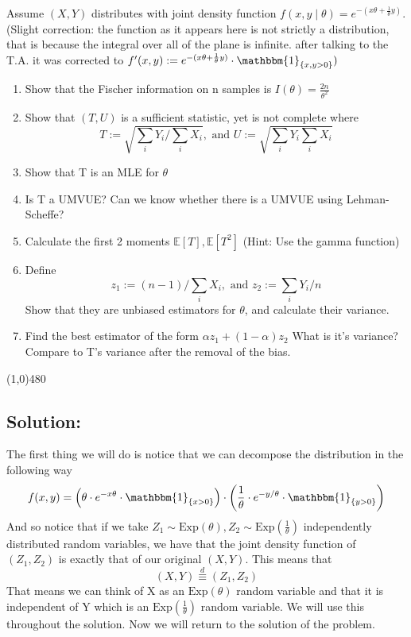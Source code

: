 \documentclass[../main.tex]{subfiles}
\begin{document}
Assume $(X,Y)$ distributes with joint density function
$f(x,y\mid\theta)=e^{-(x\theta+\frac{1}{\theta} y)}$.
(Slight correction: the function as it appears here is not strictly a  distribution, that is because the integral over all of the plane is infinite. after talking to the T.A. it was corrected to
$f'(x,y):= e^{-(x\theta+\frac{1}{\theta}y)}\cdot \mathbbm{1}_{\{x,y>0\}})$
\begin{enumerate}

    \item Show that the Fischer information on n samples is 
    $I(\theta)=\frac{2n}{\theta^2}$

    \item Show that $(T,U)$ is a sufficient statistic, yet is not complete where    
    \[T:=\sqrt{\sum_i Y_i\big/\sum_i X_i},\text{ and } U:=\sqrt{\sum_i Y_i\sum_i X_i}\]
    
    \item Show that T is an MLE for $\theta$
    
    \item Is T a UMVUE? Can we know whether there is a UMVUE using Lehman-Scheffe?
    
    \item Calculate the first 2 moments $\mathbb{E}[T],\mathbb{E}[T^2]$ (Hint: Use the gamma function)

    \item Define
    \[z_1:=(n-1)\big/\sum_i X_i,\text{ and } z_2:=\sum_i Y_i\big/n\]
    Show that they are unbiased estimators for $\theta$, and calculate their variance. 
    
    \item Find the best estimator of the form
    $\alpha z_1+(1-\alpha) z_2$
    What is it's variance? Compare to T's variance after the removal of the bias. 
\end{enumerate}
\noindent\line(1,0){480}
\subsection*{Solution:}
The first thing we will do is notice that we can decompose the distribution in the following way
\[f(x,y) = \left(\theta\cdot e^{-x\theta}\cdot\mathbbm{1}_{\{x>0\}}\right)\cdot \left(\frac{1}{\theta}\cdot e^{-y/\theta}\cdot\mathbbm{1}_{\{y>0\}}\right)\]
And so notice that if we take $Z_1\sim\text{Exp}(\theta),Z_2\sim\text{Exp}(\frac{1}{\theta})$ independently distributed random variables, we have that the joint density function of $(Z_1,Z_2)$ is exactly that of our original $(X,Y)$. This means that 
\[(X,Y)\overset{d}{\equiv}(Z_1,Z_2)\]
That means we can think of X as an $\text{Exp}(\theta)$ random variable and that it is independent of Y which is an $\text{Exp}(\frac{1}{\theta})$ random variable. We will use this throughout the solution. Now we will return to the solution of the problem. 
\end{document}
